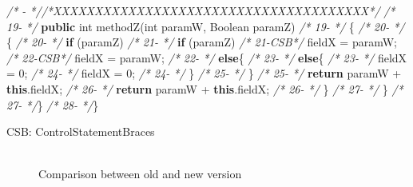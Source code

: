 \documentclass[
]{article}
\newenvironment{Shaded}{\begin{snugshade}}{\end{snugshade}}
\newcommand{\BuiltInTok}[1]{#1}
\newcommand{\CommentTok}[1]{\textcolor[rgb]{0.56,0.35,0.01}{\textit{#1}}}
\newcommand{\DataTypeTok}[1]{\textcolor[rgb]{0.13,0.29,0.53}{#1}}
\newcommand{\DecValTok}[1]{\textcolor[rgb]{0.00,0.00,0.81}{#1}}
\newcommand{\FunctionTok}[1]{\textcolor[rgb]{0.00,0.00,0.00}{#1}}
\newcommand{\KeywordTok}[1]{\textcolor[rgb]{0.13,0.29,0.53}{\textbf{#1}}}
\newcommand{\NormalTok}[1]{#1}
\begin{document}
\begin{landscape}
\begin{Shaded}
\begin{Highlighting}[]
\CommentTok{/*   -   *//*XXXXXXXXXXXXXXXXXXXXXXXXXXXXXXXXXXXXXX*/}               \CommentTok{/* 19-   */}    \KeywordTok{public} \DataTypeTok{int} \FunctionTok{methodZ}\NormalTok{(}\DataTypeTok{int}\NormalTok{ paramW, }\BuiltInTok{Boolean}\NormalTok{ paramZ)       }
\CommentTok{/* 19-   */}\NormalTok{    \{                                                    }\CommentTok{/* 20-   */}\NormalTok{    \{                                                    }
\CommentTok{/* 20-   */}        \KeywordTok{if}\NormalTok{ (paramZ)                                      }\CommentTok{/* 21-   */}        \KeywordTok{if}\NormalTok{ (paramZ)                                      }
\CommentTok{/* 21-CSB*/}\NormalTok{            fieldX = paramW;                             }\CommentTok{/* 22-CSB*/}\NormalTok{            fieldX = paramW;                             }
\CommentTok{/* 22-   */}        \KeywordTok{else}\NormalTok{\{                                            }\CommentTok{/* 23-   */}        \KeywordTok{else}\NormalTok{\{                                            }
\CommentTok{/* 23-   */}\NormalTok{            fieldX = }\DecValTok{0}\NormalTok{;                                  }\CommentTok{/* 24-   */}\NormalTok{            fieldX = }\DecValTok{0}\NormalTok{;                                  }
\CommentTok{/* 24-   */}\NormalTok{        \}                                                }\CommentTok{/* 25-   */}\NormalTok{        \}                                                }
\CommentTok{/* 25-   */}        \KeywordTok{return}\NormalTok{ paramW + }\KeywordTok{this}\NormalTok{.}\FunctionTok{fieldX}\NormalTok{;                     }\CommentTok{/* 26-   */}        \KeywordTok{return}\NormalTok{ paramW + }\KeywordTok{this}\NormalTok{.}\FunctionTok{fieldX}\NormalTok{;                     }
\CommentTok{/* 26-   */}\NormalTok{     \}                                                   }\CommentTok{/* 27-   */}\NormalTok{     \}                                                   }
\CommentTok{/* 27-   */}\NormalTok{\}                                                        }\CommentTok{/* 28-   */}\NormalTok{\}                                                        }


\NormalTok{CSB: ControlStatementBraces}
\end{Highlighting}
\end{Shaded}

\normalsize

\begin{figure}
\centering
\includegraphics{figures/fake.png}
\caption{Comparison between old and new version
\label{comparison_rename}}
\end{figure}

\end{landscape}
\end{document}
